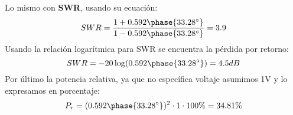 \documentclass[
	12pt, %
	fleqn, %
	a4paper, %
]{LegrandOrangeBook}
\begin{document}
\begin{example}
\begin{displaymath}
\end{displaymath}
Lo mismo con \textbf{SWR}, usando su ecuación:
\begin{displaymath}
SWR=\frac{1+0.592\phase{33.28^{\circ}}}{1-0.592\phase{33.28^{\circ}}}=3.9
\end{displaymath}
Usando la relación logarítmica para SWR se encuentra la pérdida por retorno:
\begin{displaymath}
SWR=-20\log(0.592\phase{33.28^{\circ}})=4.5dB
\end{displaymath}
Por último la potencia relativa, ya que no específica voltaje asumimos 1V y lo expresamos en porcentaje:
\begin{displaymath}
P_r=(0.592\phase{33.28^{\circ}})^2\cdot 1\cdot 100\%=34.81\%
\end{displaymath}
\end{example}
\end{document}
